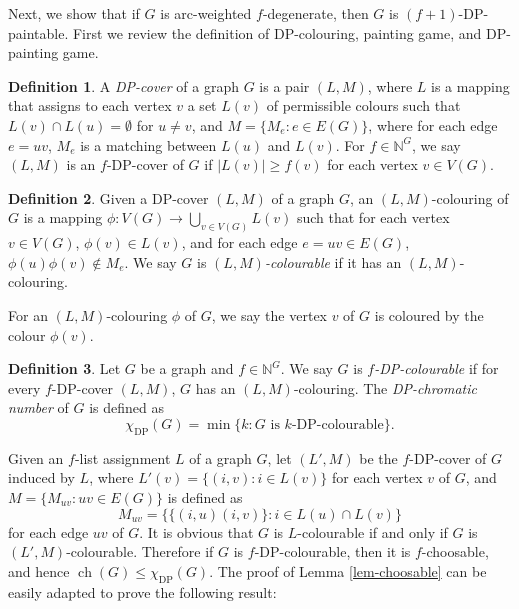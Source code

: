 \documentclass[11pt,a4paper]{article}
\theoremstyle{definition}
\newtheorem{definition}{Definition}
\begin{document}
Next, we show that if $G$ is arc-weighted  $f$-degenerate, then $G$ is $(f+1)$-DP-paintable. First we review the definition of  DP-colouring, painting game, and DP-painting game.



 \begin{definition}
	\label{def-cover}
	A {\em{\rm DP}-cover} of a graph $G $ is a pair $(L,M)$, where $L$ is a mapping that assigns to each vertex $v$ a set $L(v)$ of permissible colours such that  $L(v) \cap L(u) = \emptyset$ for $u \ne v$, and $M=\{M_{e}: e \in E(G)\}$, where for each edge $e=uv$, $M_e$ is a   matching between $L(u)$ and $L(v)$. For  $f \in \mathbb{N}^G$, we say $(L,M)$ is an $f$-DP-cover of $G$ if $|L(v)|\ge f(v)$ for each vertex $v \in V(G)$.
\end{definition}

  

\begin{definition}
	\label{def-coloring}
	Given a DP-cover $(L,M)$ of a graph $G$, an $(L,M)$-colouring of $G$ is a mapping $\phi: V(G) \to \bigcup_{v \in V(G)}L(v)$ such that for each vertex $v \in V(G)$, $\phi(v) \in L(v)$, and for each edge $e=uv \in E(G)$, $\phi(u)\phi(v) \notin  M_e$. We say $G$ is {\em $(L, M)$-colourable} if it has an $(L,M)$-colouring.
\end{definition}

 For an $(L,M)$-colouring $\phi$ of $G$, we say the vertex $v$ of $G$ is coloured by the colour $\phi(v)$.

\begin{definition}
	\label{DP-coloring}
	Let $G$ be a graph and $f \in \mathbb{N}^{G}$.  We say $G$ is {\em $f$-DP-colourable} if for every $f$-DP-cover $(L,M)$, $G$ has an $(L,M)$-colouring. The {\em DP-chromatic number} of $G$ is defined as 
 $$\chi_{\mathrm{DP}}(G)=\min\{k: G \text{ is $k$-DP-colourable} \}.$$
\end{definition}


Given an $f$-list assignment $L$ of a graph $G$, let $(L',M)$ be the  $f$-DP-cover of $G$ induced by $L$, where  $L'(v) = \{(i,v): i \in L(v)\}$ for each vertex $v$ of $G$, and $M=\{M_{uv}: uv \in E(G)\}$ is defined as $$M_{uv}=\{\{(i,u)(i,v)\}: i \in L(u) \cap L(v)\}$$
for each edge $uv$ of $G$.
It is obvious that $G$ is $L$-colourable if and only if $G$ is $(L',M)$-colourable. Therefore  if $G$ is $f$-DP-colourable, then it is $f$-choosable, and hence $\operatorname{ch}(G) \le \chi_{\mathrm{DP}}(G)$. The proof of Lemma \ref{lem-choosable} can be easily adapted to prove the following result:
\end{document}
